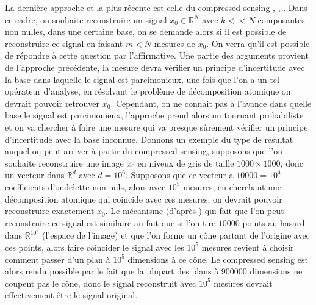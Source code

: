 La dernière approche et la plus récente est celle du compressed sensing \cite{DonohoCS}, \cite{CandesTaoUniv}, \cite{CandesSparsityIncoherence}. 
Dans ce cadre, on souhaite reconstruire un signal $x_0 \in \mathbb{R}^N$ avec $k << N$ composantes non nulles, dans une certaine base, on se demande alors si il est possible de reconstruire ce signal en faisant $m<N$ mesures de $x_0$.
On verra qu'il est possible de répondre à cette question par l'affirmative.
Une partie des arguments provient de l'approche précédente, la mesure devra vérifier un principe d'incertitude avec la base dans laquelle le signal est parcimonieux, une fois que l'on a un tel opérateur d'analyse, en résolvant le problème de décomposition atomique on devrait pouvoir retrouver $x_0$.
Cependant, on ne connait pas à l'avance dans quelle base le signal est parcimonieux, l'approche prend alors un tournant probabiliste et on va chercher à faire une mesure qui va presque sûrement vérifier un principe d'incertitude avec la base inconnue.
\newline
Donnons un exemple du type de résultat auquel on peut arriver à partir du compressed sensing, supposons que l'on souhaite reconstruire une image $x_0$ en niveux de gris de taille $1000\times1000$, donc un vecteur dans $\mathbb{R}^d$ avec $d=10^6$. 
Supposons que ce vecteur a $10 000=10^4$ coefficients d'ondelette non nuls, alors avec $10^5$ mesures, en cherchant une décomposition atomique qui coincide avec ces mesures, on devrait pouvoir reconstruire exactement $x_0$.
Le mécanisme (d'après \cite{DonohoForMost}) qui fait que l'on peut reconstruire ce signal est similaire au fait que si l'on tire $10 000$ points au hasard dans $\mathbb{R}^{10^6}$ (l'espace de l'image) et que l'on forme un cône partant de l'origine avec ces points, alors faire coincider le signal avec les $10^5$ mesures revient à choisir comment passer d'un plan à $10^5$ dimensions à ce cône.
Le compressed sensing est alors rendu possible par le fait que la plupart des plans à $900 000$ dimensions ne coupent pas le cône, donc le signal reconstruit avec $10^5$ mesures devrait effectivement être le signal original.

